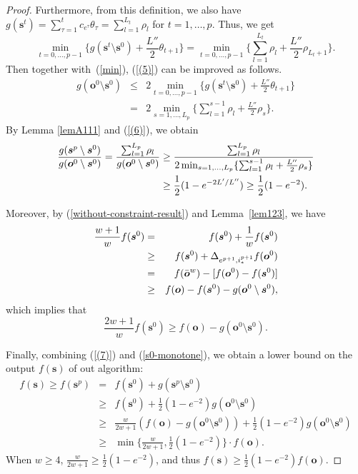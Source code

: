 \documentclass[preprint,12pt]{elsarticle}
\newcommand{\be}{\begin{equation}}
\newcommand{\ee}{\end{equation}}
\def\bea{\begin{eqnarray}}
\def\eea{\end{eqnarray}}
\def\nn{\nonumber}
\def\bo{\boldsymbol{o}}
\def\bs{\boldsymbol{s}}
\begin{document}
\begin{proof}
Furthermore, from this definition, we also have
$g(\bs^t)=\sum_{\tau=1}^tc_{e^{\tau}}\theta_{\tau}=\sum_{l=1}^{L_t}\rho_l$ for $t=1, \dots, p$.
Thus, we get
\[
\min_{t=0, \dots, p-1}\{g(\bs^t \setminus \bs^0)+\frac{L''}{2} \theta_{t+1}\}=\min_{t=0, \dots, p-1 }\{\sum_{l=1}^{L_t}\rho_l+\frac{L''}{2}\rho_{L_t+1}\}.
\]
Then together with~(\ref{min}), (\ref{(5)}) can be improved as follows.
\bea\label{(6)}
g(\bo^0 \setminus \bs^0)
&\le&  2\min_{t=0, \dots, p-1}\{g(\bs^t \setminus \bs^0)+\frac{L''}{2}\theta_{t+1}\} \nn\\
&=&  2\min_{s=1, \dots, L_p}\{\sum_{l=1}^{s-1}\rho_l+\frac{ L'' }{2}\rho_s\}.
\eea
By Lemma \ref{lemA111} and (\ref{(6)}), we obtain
\begin{align}\label{(7)}
\frac{g(\bs^{p} \setminus \bs^0) } {g(\bo^0\setminus \bs^0)} \notag
= \frac{\sum_{l=1}^{L_p }\rho_l}{g(\bo^0\setminus \bs^0)}
\ge{} & \frac{\sum_{l=1}^{L_p} \rho_l}{2\min_{s=1, \dots, L_p} \{\sum_{l=1}^{s-1}\rho_l+\frac{L'' }{2}\rho_s\}} \\
\ge{} & \frac{1}{2}(1-e^{-2L' / L''}) \geq \frac{1}{2}(1-e^{-2}).
\end{align}

Moreover, by (\ref{without-constraint-result}) and Lemma~\ref{lem123}, we have
\bea
\frac{w+1}{w} f(\bs^0) \notag
&=& f(\bs^0) + \frac{1}{w} f(\bs^0) \nn\\
&\ge& f(\bs^0) +  \Delta_{e^{p+1}, i^{p+1}_*} f(\bo^0) \nn\\
&=& f(\bar{\bo}^w) - [f(\bo^0) - f(\bs^0)] \nn\\
&\ge& f(\bo) - f(\bs^0) - g(\bo^0 \setminus \bs^0), \nn
\eea
which implies that
\be\label{s0-monotone}
\frac{2w+1}{w} f(\bs^0) \ge f(\bo) - g(\bo^0 \setminus \bs^0).
\ee

Finally, combining (\ref{(7)}) and (\ref{s0-monotone}), we obtain a lower bound on the output $f(\bs)$ of out algorithm:
\bea
f(\bs) \ge f(\bs^p) &=& f(\bs^0) + g(\bs^p \setminus \bs^0) \nn\\
&\ge& f(\bs^0) + \frac{1}{2} (1-e^{-2}) g(\bo^0 \setminus \bs^0) \nn\\
&\ge& \frac{w}{2w+1} ( f(\bo) - g(\bo^0 \setminus \bs^0) ) + \frac{1}{2} (1-e^{-2}) g(\bo^0 \setminus \bs^0) \nn\\
&\ge& \min\{ \frac{w}{2w+1}, \frac{1}{2} (1-e^{-2}) \} \cdot f(\bo). \nn
\eea
When $w\ge 4$, $\frac{w}{2w+1} \ge \frac{1}{2} (1-e^{-2})$, and thus $f(\bs) \ge \frac{1}{2} (1-e^{-2}) f(\bo)$.


\end{proof}
\end{document}
